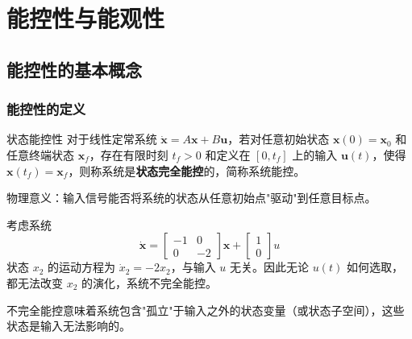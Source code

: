 
\chapter{能控性与能观性}


\section{能控性的基本概念}

\subsection{能控性的定义}

\begin{mydefinition}{状态能控性}
对于线性定常系统 $\dot{\mathbf{x}} = A\mathbf{x} + B\mathbf{u}$，若对任意初始状态 $\mathbf{x}(0) = \mathbf{x}_0$ 和任意终端状态 $\mathbf{x}_f$，存在有限时刻 $t_f > 0$ 和定义在 $[0, t_f]$ 上的输入 $\mathbf{u}(t)$，使得 $\mathbf{x}(t_f) = \mathbf{x}_f$，则称系统是\textbf{状态完全能控}的，简称系统能控。
\end{mydefinition}

物理意义：输入信号能否将系统的状态从任意初始点"驱动"到任意目标点。

\begin{example}
考虑系统
\[
\dot{\mathbf{x}} = \begin{bmatrix} -1 & 0 \\ 0 & -2 \end{bmatrix}\mathbf{x} + \begin{bmatrix} 1 \\ 0 \end{bmatrix}u
\]
状态 $x_2$ 的运动方程为 $\dot{x}_2 = -2x_2$，与输入 $u$ 无关。因此无论 $u(t)$ 如何选取，都无法改变 $x_2$ 的演化，系统{\heiti 不完全能控}。
\end{example}

不完全能控意味着系统包含"孤立"于输入之外的状态变量（或状态子空间），这些状态是输入无法影响的。

